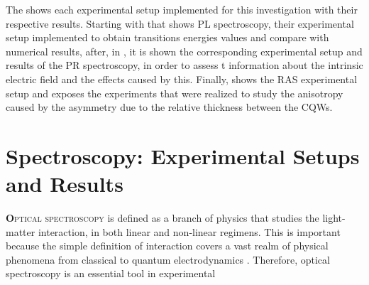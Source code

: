 The  shows each experimental setup implemented for this investigation with
their respective results. Starting with   that shows \gls{PL} spectroscopy, their
experimental setup implemented to obtain transitions energies values and compare with
numerical results, after, in , it is shown the corresponding experimental setup and results of the \gls{PR} spectroscopy, in order to assess t information about the intrinsic electric field and the effects caused by this. Finally,  shows the \gls{RAS} experimental setup and exposes the experiments
that were realized to study the anisotropy caused by the asymmetry due to the relative thickness between the \gls{CQWs}.

\section{Spectroscopy: Experimental Setups and Results}
\label{sec:chapter 3 Spectroscopy}
\vspace{-10mm} 
\lettrine[lines=3, lraise=.1, nindent=0mm, slope=0mm]{\textbf{O}}{ptical spectroscopy}
is defined as a branch of physics that studies the light-matter interaction, in both linear and non-linear regimens. This is important because the simple definition of interaction covers a vast realm of physical phenomena from classical to quantum electrodynamics \cite{weiner2017light}. Therefore, optical spectroscopy is an essential tool in experimental

